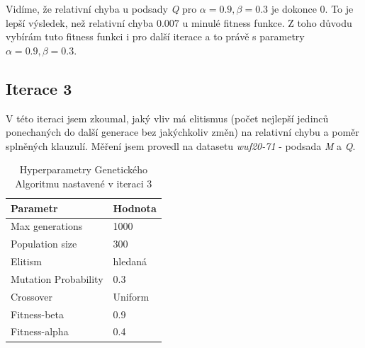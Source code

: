 \documentclass[12pt]{article}
\begin{document}
Vidíme, že relativní chyba u podsady \textit{Q} pro $\alpha=0.9, \beta=0.3$ je dokonce 0. To je lepší výsledek, než relativní chyba $0.007$ u minulé fitness funkce. Z toho důvodu vybírám tuto fitness funkci i pro další iterace a to právě s parametry $\alpha=0.9, \beta=0.3$.


\subsection{Iterace 3}

V této iteraci jsem zkoumal, jaký vliv má elitismus (počet nejlepší jedinců ponechaných do další generace bez jakýchkoliv změn) na relativní chybu a poměr splněných klauzulí. Měření jsem provedl na datasetu \textit{wuf20-71} - podsada \textit{M} a \textit{Q}.

\begin{table}[H]
\centering
\caption{Hyperparametry Genetického Algoritmu nastavené v iteraci 3}
\begin{tabular}{@{}ll@{}}
\toprule
\textbf{Parametr}        & \textbf{Hodnota}       \\ \midrule
Max generations           & 1000                \\
Population size           & 300                 \\
Elitism                   & hledaná                 \\
Mutation Probability      & 0.3                 \\
Crossover                 & Uniform             \\
Fitness-beta              & 0.9            \\
Fitness-alpha             & 0.4                 \\ \bottomrule
\end{tabular}
\label{tab:ga_parameters}
\end{table}
\end{document}
